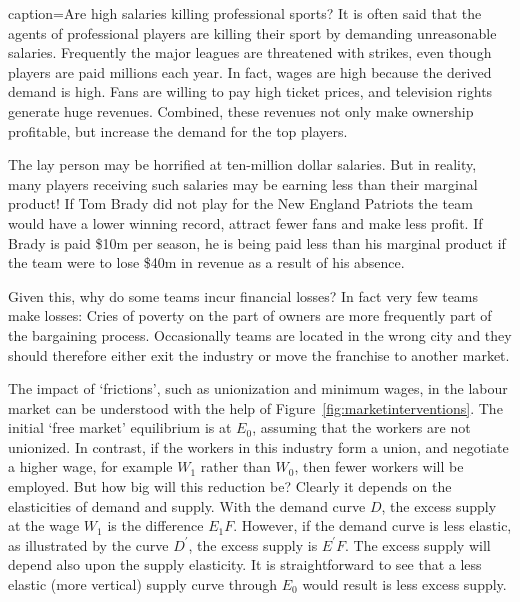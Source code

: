 \begin{ApplicationBox}{caption={Are high salaries killing professional sports? \label{app:highsalarysport}}}
It is often said that the agents of professional players are killing their sport by demanding unreasonable salaries. Frequently the major leagues are threatened with strikes, even though players are paid millions each year. In fact, wages are high because the derived demand is high. Fans are willing to pay high ticket prices, and television rights generate huge revenues. Combined, these revenues not only make ownership profitable, but increase the demand for the top players.

The lay person may be horrified at ten-million dollar salaries. But in reality, many players receiving such salaries may be earning less than their marginal product! If Tom Brady did not play for the New England Patriots the team would have a lower winning record, attract fewer fans and make less profit. If Brady is paid \$10m per season, he is being paid less than his marginal product if the team were to lose \$40m in revenue as a result of his absence.

Given this, why do some teams incur financial losses? In fact very few teams make losses: Cries of poverty on the part of owners are more frequently part of the bargaining process. Occasionally teams are located in the wrong city and they should therefore either exit the industry or move the franchise to another market. 
\end{ApplicationBox}

\newhtmlpage

The impact of `frictions', such as unionization and minimum wages, in the
labour market can be understood with the help of Figure~\ref{fig:marketinterventions}.
The initial `free market' equilibrium is at $E_{0}$, 
assuming that the workers are not unionized. In contrast, if the workers
in this industry form a union, and negotiate a higher wage, for example 
$W_{1}$ rather than $W_{0}$, then fewer workers will be employed. But how big
will this reduction be? Clearly it depends on the elasticities of demand and 
supply. With the demand curve $D$, the excess supply at the wage $W_{1}$ is the
difference $E_{1}F$. However, if the demand curve is less elastic, as
illustrated by the curve $D^{\prime}$, the excess supply is $E^{\prime}F$.
The excess supply will depend also upon the supply elasticity. It is
straightforward to see that a less elastic (more vertical) supply curve
through $E_{0}$ would result is less excess supply.

